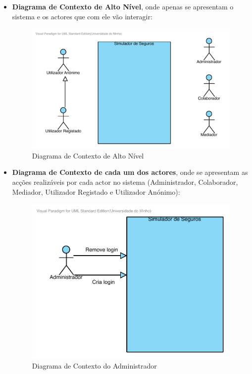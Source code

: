 \begin{itemize}

\item \textbf{Diagrama de Contexto de Alto Nível}, onde apenas se apresentam o sistema e os actores que com ele vão interagir:

\begin{figure}[!htb]
	\centering
	\includegraphics[scale=0.8]{images/DiagramaContextoAltoNivel}
	\caption{Diagrama de Contexto de Alto Nível}
\end{figure}

\item \textbf{Diagrama de Contexto de cada um dos actores}, onde se apresentam as acções realizáveis por cada actor no sistema (Administrador, Colaborador, Mediador, Utilizador Registado e Utilizador Anónimo):

\begin{figure}[!htb]
	\centering
	\includegraphics[scale=0.75]{images/DiagramaContextoAdministrador}
	\caption{Diagrama de Contexto do Administrador}
\end{figure}


\end{itemize}
